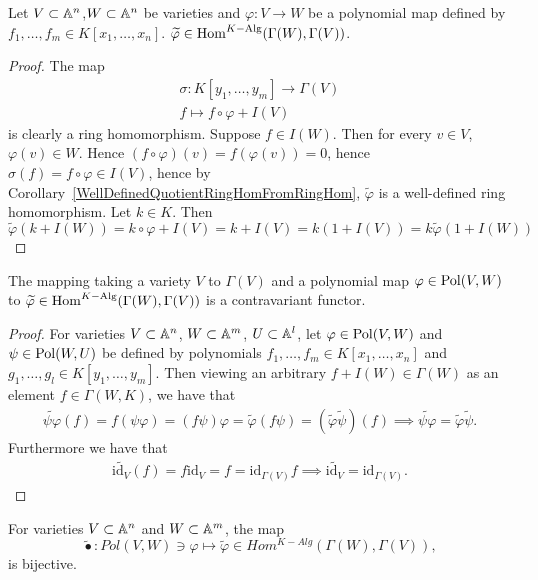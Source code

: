 \begin{proposition}\label{InducedRingHomIsWellDef}
     Let $V\subset \mathbb{A}^n$,$W\subset \mathbb{A}^n$ be varieties and $\varphi: V\rightarrow W$ be a polynomial map defined by $f_1,\dots,f_m\in K[x_1,\dots,x_n]$. $\widetilde{\varphi}\in \mathrm{Hom}^{K-\text{Alg}}(\Gamma(W),\Gamma(V))$.
\end{proposition}
\begin{proof}
    The map 
    \begin{gather*}
        \sigma : K[y_1,\dots,y_m] \rightarrow \Gamma(V)\\
        f \mapsto f\circ \varphi + I(V)
    \end{gather*}
    is clearly a ring homomorphism. Suppose $f\in I(W)$. Then for every $v\in V$, $\varphi(v)\in W$. Hence $(f\circ \varphi)(v) = f(\varphi(v)) = 0$, hence $\sigma(f)=f\circ \varphi \in I(V)$, hence by Corollary~\ref{WellDefinedQuotientRingHomFromRingHom}, $\widetilde{\varphi}$ is a well-defined ring homomorphism. Let $k\in K$. Then 
    $$\widetilde{\varphi}(k+ I(W)) = k \circ \varphi + I(V) = k+ I(V) = k(1+I(V))= k\widetilde{\varphi}(1 + I(W))$$
\end{proof}
\begin{lemma}\label{GammaTildeIsAFunctor}
    The mapping taking a variety $V$ to $\Gamma(V)$ and a polynomial map $\varphi\in \mathrm{Pol}(V,W)$ to $\widetilde{\varphi}\in \mathrm{Hom}^{K-\text{Alg}}(\Gamma(W),\Gamma(V))$ is a contravariant functor.
\end{lemma}
\begin{proof}
    For varieties $V\subset \mathbb{A}^n$, $W\subset \mathbb{A}^m$, $U\subset \mathbb{A}^l$, let $\varphi\in \mathrm{Pol}(V,W)$ and $\psi \in \mathrm{Pol}(W,U)$ be defined by polynomials $f_1,\dots,f_m\in K[x_1,\dots,x_n]$ and $g_1,\dots, g_l\in K[y_1,\dots,y_m]$. Then viewing an arbitrary $f+I(W)\in \Gamma(W)$ as an element $f \in \Gamma(W,K)$, we have that 
    \begin{align*}
        \widetilde{\psi\varphi}(f) = f(\psi\varphi) = (f\psi)\varphi = \widetilde{\varphi}(f\psi)= (\widetilde{\varphi}\widetilde{\psi})(f) \implies \widetilde{\psi\varphi} = \widetilde{\varphi}\widetilde{\psi}. 
    \end{align*} 
    Furthermore we have that 
    \begin{align*}
        \widetilde{\text{id}_V}(f) = f \text{id}_V = f = \text{id}_{\Gamma(V)} f \implies \widetilde{\text{id}_V} = \text{id}_{\Gamma(V)}.
    \end{align*}
\end{proof}
\begin{theorem}
    For varieties $V\subset \mathbb{A}^n$ and $W\subset \mathbb{A}^m$, the map 
    $$\widetilde{\bullet}:Pol(V,W)\ni \varphi \mapsto \widetilde{\varphi} \in Hom^{K-Alg}(\Gamma(W),\Gamma(V)),$$
    is bijective. 
\end{theorem}
